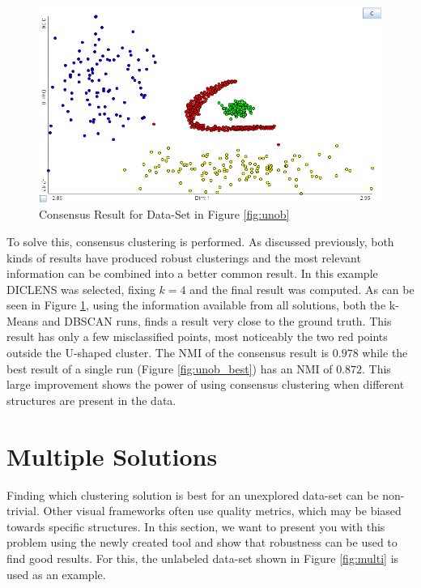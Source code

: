 \documentclass[
	a4paper,
	english,
	twoside,
	openright,               
	11pt                            
	]{report}
\begin{document}
\begin{figure}[h]
	\centering
	\includegraphics[scale=.5]{unob_consensus}
	\caption{Consensus Result for Data-Set in Figure \ref{fig:unob}}
	\label{fig:unob_consensus}
\end{figure}

To solve this, consensus clustering is performed. As discussed previously, both kinds of results have produced robust clusterings and the most relevant information can be combined into a better common result. In this example DICLENS was selected, fixing $k=4$ and the final result was computed. As can be seen in Figure \ref{fig:unob_consensus}, using the information available from all solutions, both the k-Means and DBSCAN runs, finds a result very close to the ground truth. This result has only a few misclassified points, most noticeably the two red points outside the U-shaped cluster. The NMI of the consensus result is $0.978$ while the best result of a single run (Figure \ref{fig:unob_best}) has an NMI of $0.872$. This large improvement shows the power of using consensus clustering when different structures are present in the data.


\section{Multiple Solutions}\label{sec:multi_sol}
Finding which clustering solution is best for an unexplored data-set can be non-trivial. Other visual frameworks often use quality metrics, which may be biased towards specific structures. In this section, we want to present you with this problem using the newly created tool and show that robustness can be used to find good results. For this, the unlabeled data-set shown in Figure \ref{fig:multi} is used as an example.
\end{document}
